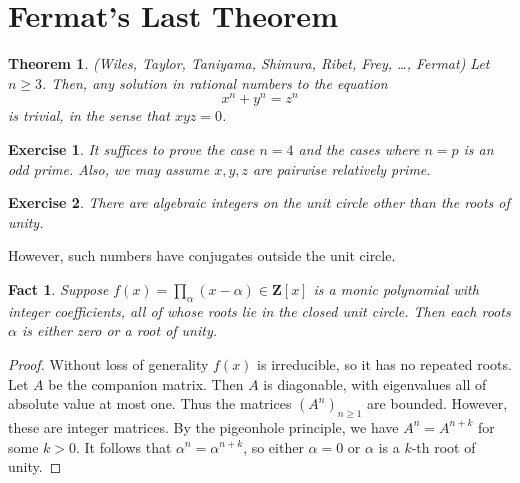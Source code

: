 \documentclass[12pt]{article}
\newtheorem*{fact*}{Fact}
\newtheorem*{exer*}{Exercise}
\newtheorem*{theorem*}{Theorem}
\newcommand{\Q}{\mathbf{Q}}
\newcommand{\Z}{\mathbf{Z}}
\begin{document}
\newpage
\section{Fermat's Last Theorem}
\begin{theorem*}(Wiles, Taylor, Taniyama, Shimura, Ribet, Frey, \dots, Fermat)
Let $n\ge 3$. Then, any solution in rational numbers to the equation \[x^n+y^n=z^n\]
is trivial, in the sense that $xyz=0$.
\end{theorem*}


\begin{exer*}
It suffices to prove the case $n=4$ and the cases where $n=p$ is an odd prime. Also, we may assume $x,y,z$ are pairwise relatively prime.
\end{exer*}


\begin{exer*}
There are algebraic integers on the unit circle other than the roots of unity.
\end{exer*}




However, such numbers have conjugates outside the unit circle.


\begin{fact*}
Suppose $f(x)=\prod_\alpha(x-\alpha)\in\Z[x]$ is a monic polynomial with integer coefficients, all of whose roots lie in the closed unit circle. Then each roots $\alpha$ is either zero or a root of unity.
\end{fact*}


\begin{proof}
Without loss of generality $f(x)$ is irreducible, so it has no repeated roots. Let $A$ be the companion matrix. Then $A$ is diagonable, with eigenvalues all of absolute value at most one. Thus the matrices $(A^n)_{n\ge 1}$ are bounded. However, these are integer matrices. By the pigeonhole principle, we have $A^n = A^{n+k}$ for some $k>0$. It follows that $\alpha^n=\alpha^{n+k}$, so either $\alpha=0$ or $\alpha$ is a $k$-th root of unity.
\end{proof}
\end{document}
